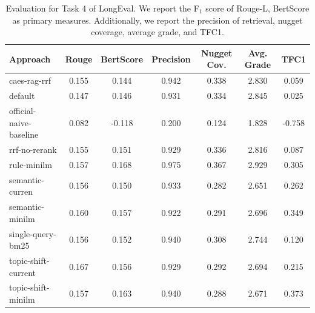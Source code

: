 \begin{table}[t]
\caption{Evaluation for Task 4 of LongEval. We report the F$_{1}$ score of Rouge-L, BertScore as primary measures. Additionally, we report the precision of retrieval, nugget coverage, average grade, and TFC1.}
\centering
\begin{tabular}{@{}lcccccc@{}}
\toprule
\bf Approach  & \bf Rouge & \bf BertScore & \bf Precision & \bf Nugget Cov. & \bf Avg. Grade & \bf TFC1 \\
\midrule

caes-rag-rrf & 0.155 & 0.144 & 0.942 & 0.338 & 2.830 & 0.059\\


default & 0.147 & 0.146 & 0.931 & 0.334 & 2.845 & 0.025\\


official-naive-baseline & 0.082 & -0.118 & 0.200 & 0.124 & 1.828 & -0.758\\


rrf-no-rerank & 0.155 & 0.151 & 0.929 & 0.336 & 2.816 & 0.087\\


rule-minilm & 0.157 & 0.168 & 0.975 & 0.367 & 2.929 & 0.305\\


semantic-curren & 0.156 & 0.150 & 0.933 & 0.282 & 2.651 & 0.262\\


semantic-minilm & 0.160 & 0.157 & 0.922 & 0.291 & 2.696 & 0.349\\


single-query-bm25 & 0.156 & 0.152 & 0.940 & 0.308 & 2.744 & 0.120\\


topic-shift-current & 0.167 & 0.156 & 0.929 & 0.292 & 2.694 & 0.215\\


topic-shift-minilm & 0.157 & 0.163 & 0.940 & 0.288 & 2.671 & 0.373\\


\bottomrule
\end{tabular}
\label{table-evaluation}
\end{table}